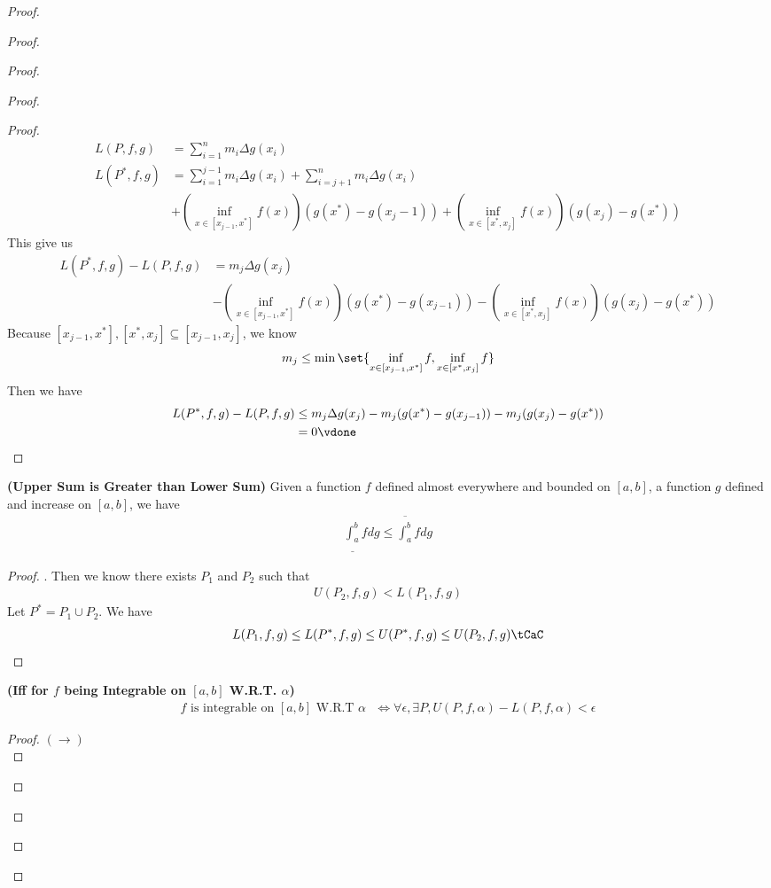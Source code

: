 \documentclass{report}
\begin{document}
\begin{proof}
\begin{proof}
\begin{proof}
\begin{proof}
\begin{proof}
\begin{align*}
L(P,f,g)&=\sum_{i=1}^n m_i \Delta g(x_i)\\
L(P^*,f,g)&=\sum_{i=1}^{j-1}m_i\Delta g(x_i)+\sum_{i=j+1}^n m_i\Delta g(x_i)\\
&+(\inf_{x\in [x_{j-1},x^*]}f(x))(g(x^*)-g(x_j-1))+(\inf_{x\in [x^*,x_j]} f(x))(g(x_j)-g(x^*))
\end{align*}
This give us 
\begin{align*}
L(P^*,f,g)-L(P,f,g)&=m_j\Delta g(x_j)\\
&-(\inf_{x\in [x_{j-1},x^*]} f(x)) (g(x^*)-g(x_{j-1}))-(\inf_{x\in[x^*,x_j]}f(x))(g(x_j)-g(x^*))
\end{align*}
Because $[x_{j-1},x^*],[x^*,x_j]\subseteq [x_{j-1},x_j]$, we know 
\begin{align*}
  m_j\leq \min \set{\inf_{x\in [x_{j-1},x^*]}f,\inf_{x\in [x^*,x_j]}f}
\end{align*}
Then we have 
\begin{align*}
L(P^*,f,g)-L(P,f,g)&\leq m_j \Delta g(x_j)-m_j (g(x^*)-g(x_{j-1}))-m_j (g(x_j)-g(x^*))\\
&=0 \vdone
\end{align*}
\end{proof}
\begin{theorem}
\label{7.1.13}
\textbf{(Upper Sum is Greater than Lower Sum)} Given a function $f$ defined almost everywhere and bounded on $[a,b]$, a function $g$ defined and increase on $[a,b]$, we have 
\begin{align*}
\underline{\int_a^b}fdg\leq \overline{\int_a^b}fdg
\end{align*}
\end{theorem}
\begin{proof}
. Then we know there exists $P_1$ and  $P_2$ such that 
\begin{align*}
U(P_2,f,g)<L(P_1,f,g)
\end{align*}
Let $P^*=P_1\cup P_2$. We have
\begin{align*}
L(P_1,f,g)\leq L(P^*,f,g)\leq U(P^*,f,g)\leq U(P_2,f,g)\tCaC
\end{align*}
\end{proof}
\begin{theorem}
\label{7.1.14}
\textbf{(Iff for $f$ being Integrable on $[a,b]$ W.R.T. $\alpha $)}
\begin{align*}
f\text{ is integrable on $[a,b]$ W.R.T $\alpha $ }\iff  \forall \epsilon ,\exists P, U(P,f,\alpha )-L(P,f,\alpha )<\epsilon 
\end{align*}
\end{theorem}
\begin{proof}
$(\longrightarrow)$\\


\end{proof}
\end{proof}
\end{proof}
\end{proof}
\end{proof}
\end{document}
